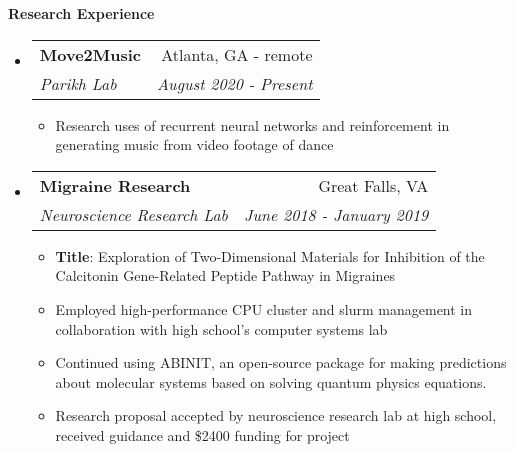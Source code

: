 \documentclass[letterpaper,10pt]{article}
\makeatletter
\newcommand{\resitem}[1]{\item #1 \vspace{-2pt}}
\newcommand{\resheading}[1]{{\large \colorbox{mygrey}{\begin{minipage}{\textwidth}{\textbf{#1 \vphantom{p\^{E}}}}\end{minipage}}}}
\newcommand{\ressubheading}[4]{
\begin{tabular*}{7.0in}{l@{\extracolsep{\fill}}r}
		\textbf{#1} & #2 \\
		\textit{#3} & \textit{#4} \\
\end{tabular*}\vspace{-6pt}}
\makeatother
\begin{document}
\resheading{Research Experience}
\begin{itemize}
\item
    \ressubheading{Move2Music}{Atlanta, GA - remote}{Parikh Lab}{August 2020 - Present}
    \begin{itemize}
        \resitem{Research uses of recurrent neural networks and reinforcement in generating music from video footage of dance}
    \end{itemize}
\item
	\ressubheading{Migraine Research}{Great Falls, VA}{Neuroscience Research Lab}{June 2018 - January 2019}
	\begin{itemize}
		\resitem{\textbf{Title}: Exploration of Two-Dimensional Materials for Inhibition of the Calcitonin Gene-Related Peptide Pathway in Migraines}
	    \resitem{Employed high-performance CPU cluster and slurm management in collaboration with high school's computer systems lab}
	    \resitem{Continued using ABINIT, an open-source package for making predictions about molecular systems based on solving quantum physics equations.}
	    \resitem{Research proposal accepted by neuroscience research lab at high school, received guidance and \$2400 funding for project}
	\end{itemize}

\end{itemize}
\end{document}
